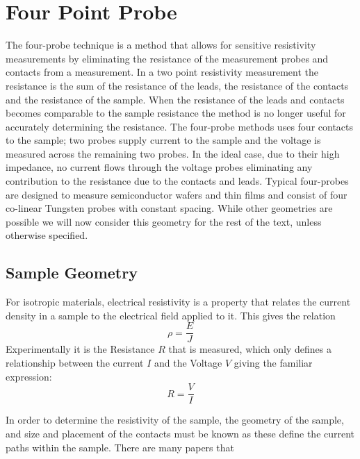 
\chapter{Four Point Probe}

    
    The four-probe technique is a method that allows for sensitive resistivity measurements by eliminating the resistance of the measurement probes and contacts from a measurement. In a two point resistivity measurement the resistance is the sum of the resistance of the leads, the resistance of the contacts and the resistance of the sample. %
    When the resistance of the leads and contacts becomes comparable to the sample resistance the method is no longer useful for accurately determining the resistance. The four-probe methods uses four contacts to the sample; two probes supply current to the sample and the voltage is measured across the remaining two probes. In the ideal case, due to their high impedance, no current flows through the voltage probes eliminating any contribution to the resistance due to the contacts and leads. Typical four-probes are designed to measure semiconductor wafers and thin films and consist of four co-linear Tungsten probes with constant spacing. While other geometries are possible %
    we will now consider this geometry for the rest of the text, unless otherwise specified. 
    
 \section{Sample Geometry}
 
    For isotropic materials, electrical resistivity is a property that relates the current density in a sample to the electrical field applied to it. This gives the relation \begin{equation}
        \rho = \frac{E}{J}
    \end{equation}
    Experimentally it is the Resistance $R$ that is measured, which only defines a relationship between the current $I$ and the Voltage $V$ giving the familiar expression: \begin{equation}
        R = \frac{V}{I}
    \end{equation}
    
    In order to determine the resistivity of the sample, the geometry of the sample, and size and placement of the contacts must be known as these define the current paths within the sample. There are many papers that 
    

